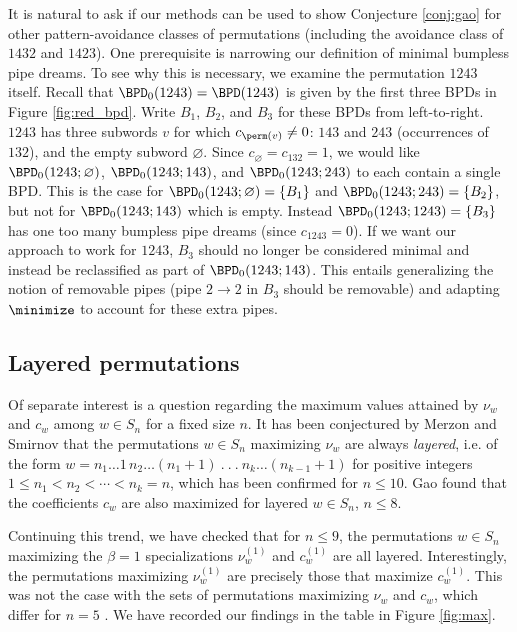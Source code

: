 It is natural to ask if our methods can be used to show Conjecture \ref{conj:gao} for other pattern-avoidance classes of permutations (including the avoidance class of $1432$ and $1423$).
One prerequisite is narrowing our definition of minimal bumpless pipe dreams.
To see why this is necessary, we examine the permutation $1243$ itself.
Recall that $\BPD_0(1243) = \BPD(1243)$ is given by the first three BPDs in Figure \ref{fig:red_bpd}.
Write $B_1$, $B_2$, and $B_3$ for these BPDs from left-to-right.
$1243$ has three subwords $v$ for which $c_{\perm(v)}\neq 0$: $143$ and $243$ (occurrences of $132$), and the empty subword $\varnothing$.
Since $c_\varnothing = c_{132} = 1$, we would like $\BPD_0(1243;\varnothing)$, $\BPD_0(1243;143)$, and $\BPD_0(1243;243)$ to each contain a single BPD.
This is the case for $\BPD_0(1243;\varnothing) = \{B_1\}$ and $\BPD_0(1243;243) = \{B_2\}$, but not for $\BPD_0(1243;143)$ which is empty.
Instead $\BPD_0(1243;1243) = \{B_3\}$ has one too many bumpless pipe dreams (since $c_{1243} = 0$).
If we want our approach to work for $1243$, $B_3$ should no longer be considered minimal and instead be reclassified as part of $\BPD_0(1243;143)$.
This entails generalizing the notion of removable pipes (\eg pipe $2\to 2$ in $B_3$ should be removable) and adapting $\minimize$ to account for these extra pipes.



\subsection{Layered permutations}

Of separate interest is a question regarding the maximum values attained by $\nu_w$ and $c_w$ among $w\in S_n$ for a fixed size $n$.
It has been conjectured by Merzon and Smirnov \cite{MS16} that the permutations $w\in S_n$ maximizing $\nu_w$ are always \textit{layered}, i.e. of the form $w = n_1 \dots 1\,
    n_2\dots (n_1+1)
    \ .\ .\ .\ 
    n_k\dots (n_{k-1}+1)
$ for positive integers $1\leq n_1< n_2< \cdots< n_k=n$, which has been confirmed for $n\leq 10$.
Gao \cite{Gao21} found that the coefficients $c_w$ are also maximized for layered $w\in S_n$, $n\leq 8$.

Continuing this trend, we have checked that for $n\leq 9$, the permutations $w\in S_n$ maximizing the $\beta=1$ specializations $\nu^{(1)}_w$ and $c^{(1)}_w$ are all layered.
Interestingly, the permutations maximizing $\nu^{(1)}_w$ are precisely those that maximize $c^{(1)}_w$.
This was not the case with the sets of permutations maximizing $\nu_w$ and $c_w$, which differ for $n=5$ \cite{Sta17,Gao21}.
We have recorded our findings in the table in Figure \ref{fig:max}.

